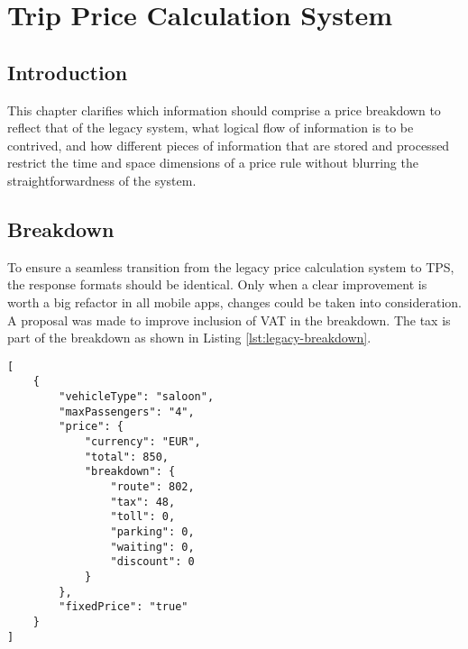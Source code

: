 \graphicspath{{Chapter4/Figs/Vector/}{Chapter4/Figs/}}

%
\chapter{Trip Price Calculation System}
\section{Introduction}
This chapter clarifies which information should comprise a price breakdown to reflect that of the legacy system, what logical flow of information is to be contrived, and how different pieces of information that are stored and processed restrict the time and space dimensions of a price rule without blurring the straightforwardness of the system.

%
\section{Breakdown}
To ensure a seamless transition from the legacy price calculation system to TPS, the response formats should be identical. Only when a clear improvement is worth a big refactor in all mobile apps, changes could be taken into consideration. A proposal was made to improve inclusion of VAT in the breakdown. The tax is part of the breakdown as shown in Listing \ref{lst:legacy-breakdown}.

\noindent\begin{minipage}{.45\textwidth}
\begin{lstlisting}[caption={Legacy price breakdown}, label={lst:legacy-breakdown}]
[
	{
		"vehicleType": "saloon",
		"maxPassengers": "4",
		"price": {
			"currency": "EUR",
			"total": 850,
			"breakdown": {
				"route": 802,
				"tax": 48,
				"toll": 0,
				"parking": 0,
				"waiting": 0,
				"discount": 0
			}
		},
		"fixedPrice": "true"
	}
]
\end{lstlisting}
\end{minipage}

